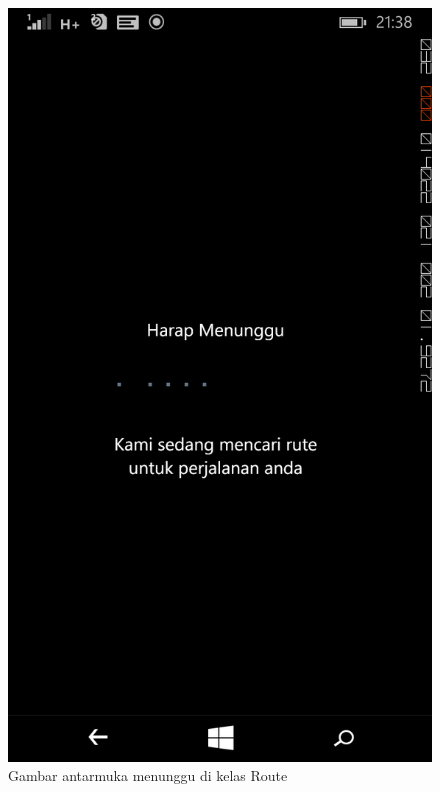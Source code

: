 	\begin{figure}[!h]
		\centering
			\includegraphics[scale=0.2]{Gambar/antarmuka/wait_route}
		\caption{Gambar antarmuka menunggu di kelas Route}
		\label{fig:antarmuka menunggu Route}
	\end{figure}
	
